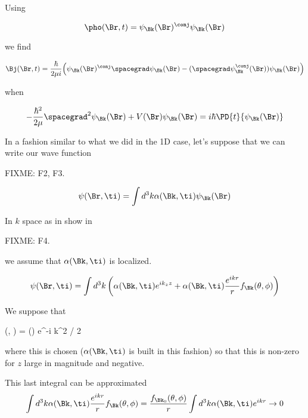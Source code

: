 Using 

\begin{equation}\label{eqn:qmTwoL24:n}
\pho(\Br, t) = 
\psi_\Bk(\Br)^\conj
\psi_\Bk(\Br)
\end{equation}

we find

\begin{equation}\label{eqn:qmTwoL24:n}
\Bj(\Br, t) = \frac{\hbar}{2 \mu i} \Bigl( 
\psi_\Bk(\Br)^\conj \spacegrad \psi_\Bk(\Br)
- (\spacegrad \psi_\Bk^\conj(\Br)) \psi_\Bk(\Br) 
\Bigr)
\end{equation}

when 

\begin{equation}\label{eqn:qmTwoL24:n}
-\frac{\hbar^2}{2\mu} \spacegrad^2 
\psi_\Bk(\Br)
+ V(\Br)
\psi_\Bk(\Br)
= 
i \hbar \PD{t}{
\psi_\Bk(\Br)
}
\end{equation}

In a fashion similar to what we did in the 1D case, let's suppose that we can write our wave function

FIXME: F2, F3.

\begin{equation}\label{eqn:qmTwoL24:n}
\psi(\Br, \ti) = \int d^3k \alpha(\Bk, \ti) \psi_\Bk(\Br)
\end{equation}

In $k$ space as in show in

FIXME: F4.

we assume that $\alpha(\Bk, \ti)$ is localized.

\begin{equation}\label{eqn:qmTwoL24:n}
\psi(\Br, \ti) = 
\int d^3k 
\left(
\alpha(\Bk, \ti)
e^{i k_z z} 
+
\alpha(\Bk, \ti) \frac{e^{i k r}}{r} f_\Bk(\theta, \phi)
\right)
\end{equation}

We suppose that

\alpha(\Bk, \ti) = \alpha(\Bk) e^{-i \hbar k^2 \ti/ 2\mu}

where this is chosen ($\alpha(\Bk, \ti)$ is built in this fashion) so that this is non-zero for $z$ large in magnitude and negative.

This last integral can be approximated
\begin{equation}\label{eqn:qmTwoL24:n}
\int d^3k 
\alpha(\Bk, \ti) \frac{e^{i k r}}{r} f_\Bk(\theta, \phi)
=
\frac{f_{\Bk_0}(\theta, \phi)}{r}
\int d^3k 
\alpha(\Bk, \ti) e^{i k r}
\rightarrow 0
\end{equation}

